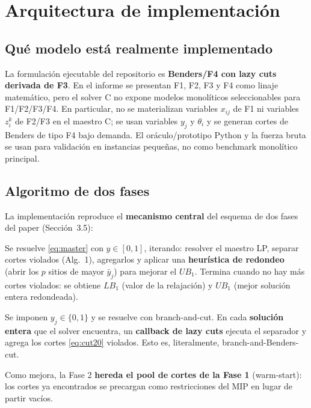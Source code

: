 \section{Arquitectura de implementación}
\label{sec:implementacion}

\subsection{Qué modelo está realmente implementado}
La formulación ejecutable del repositorio es \textbf{Benders/F4 con lazy cuts derivada de
F3}. En el informe se presentan F1, F2, F3 y F4 como linaje matemático, pero el solver C no expone
modelos monolíticos seleccionables para F1/F2/F3/F4. En particular, no se materializan variables
$x_{ij}$ de F1 ni variables $z_i^k$ de F2/F3 en el maestro C; se usan variables $y_j$ y
$\theta_i$ y se generan cortes de Benders de tipo F4 bajo demanda. El oráculo/prototipo Python y
la fuerza bruta se usan para validación en instancias pequeñas, no como benchmark monolítico
principal.

\subsection{Algoritmo de dos fases}
La implementación reproduce el \textbf{mecanismo central} del esquema de dos fases del paper
(Sección~3.5):
\begin{description}[leftmargin=1.5em]
  \item[Fase 1 — relajación lineal del maestro.] Se resuelve \eqref{eq:master} con $y\in[0,1]$,
        iterando: resolver el maestro LP, separar cortes violados (Alg.~1), agregarlos y aplicar
        una \textbf{heurística de redondeo} (abrir los $p$ sitios de mayor $\bar y_j$) para mejorar
        el $UB_1$. Termina cuando no hay más cortes violados: se obtiene $LB_1$ (valor de la
        relajación) y $UB_1$ (mejor solución entera redondeada).
  \item[Fase 2 — branch-and-Benders-cut.] Se imponen $y_j\in\{0,1\}$ y se resuelve con
        branch-and-cut. En cada \textbf{solución entera} que el solver encuentra, un
        \textbf{callback de lazy cuts} ejecuta el separador y agrega los cortes
        \eqref{eq:cut20} violados. Esto es, literalmente, branch-and-Benders-cut.
\end{description}
Como mejora, la Fase 2 \textbf{hereda el pool de cortes de la Fase 1} (warm-start): los cortes ya
encontrados se precargan como restricciones del MIP en lugar de partir vacíos.

